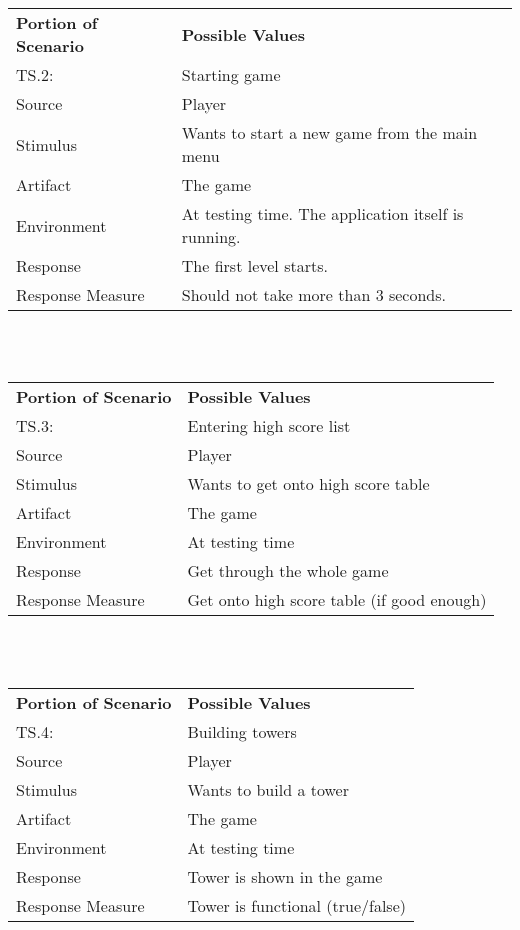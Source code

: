 \documentclass[11pt,a4paper]{article}
\begin{document}
~\\\\

\noindent \begin{tabular}{ l p{7cm} }
\hline
\textbf{Portion of Scenario} & \textbf{Possible Values} \\
TS.2: & Starting game \\
\hline
Source & Player \\
Stimulus & Wants to start a new game from the main menu \\
Artifact & The game \\
Environment & At testing time. The application itself is running. \\
Response & The first level starts. \\
Response Measure & Should not take more than 3 seconds. \\
\hline 
\end{tabular}

~\\\\

\noindent \begin{tabular}{ l p{7cm} }
\hline
\textbf{Portion of Scenario} & \textbf{Possible Values} \\
TS.3: & Entering high score list \\
\hline
Source & Player \\
Stimulus & Wants to get onto high score table \\
Artifact & The game \\
Environment & At testing time \\
Response & Get through the whole game \\
Response Measure & Get onto high score table (if good enough) \\
\hline 
\end{tabular}

~\\\\

\begin{tabular}{ l p{7cm} }
\hline
\textbf{Portion of Scenario} & \textbf{Possible Values} \\
TS.4: & Building towers \\
\hline
Source & Player \\
Stimulus & Wants to build a tower \\
Artifact & The game \\
Environment & At testing time \\
Response & Tower is shown in the game \\
Response Measure & Tower is functional (true/false) \\
\hline 
\end{tabular}
\end{document}
